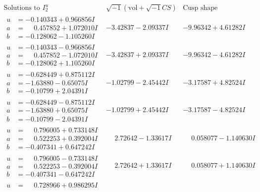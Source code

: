 \documentclass[1p]{elsarticle_modified}
\theoremstyle{definition}
\newcommand{\I}{\sqrt{-1}}
\begin{document}
$$\begin{array}{c|c|c}  
\text{Solutions to }I^u_{2}& \I (\text{vol} + \sqrt{-1}CS) & \text{Cusp shape}\\
 \hline 
\begin{aligned}
u &= -0.140343 + 0.966856 I \\
a &= \phantom{-}0.457852 + 1.072010 I \\
b &= -0.128062 - 1.105260 I\end{aligned}
 & -3.42837 - 2.09337 I & -9.96342 + 4.61282 I \\ \hline\begin{aligned}
u &= -0.140343 - 0.966856 I \\
a &= \phantom{-}0.457852 - 1.072010 I \\
b &= -0.128062 + 1.105260 I\end{aligned}
 & -3.42837 + 2.09337 I & -9.96342 - 4.61282 I \\ \hline\begin{aligned}
u &= -0.628449 + 0.875112 I \\
a &= -1.63880 - 0.65075 I \\
b &= -0.10799 + 2.04391 I\end{aligned}
 & -1.02799 - 2.45442 I & -3.17587 + 4.82524 I \\ \hline\begin{aligned}
u &= -0.628449 - 0.875112 I \\
a &= -1.63880 + 0.65075 I \\
b &= -0.10799 - 2.04391 I\end{aligned}
 & -1.02799 + 2.45442 I & -3.17587 - 4.82524 I \\ \hline\begin{aligned}
u &= \phantom{-}0.796005 + 0.733148 I \\
a &= \phantom{-}0.522253 + 0.392004 I \\
b &= -0.407341 + 0.647242 I\end{aligned}
 & \phantom{-}2.72642 - 1.33617 I & \phantom{-}0.058077 - 1.140630 I \\ \hline\begin{aligned}
u &= \phantom{-}0.796005 - 0.733148 I \\
a &= \phantom{-}0.522253 - 0.392004 I \\
b &= -0.407341 - 0.647242 I\end{aligned}
 & \phantom{-}2.72642 + 1.33617 I & \phantom{-}0.058077 + 1.140630 I \\ \hline\begin{aligned}
u &= \phantom{-}0.728966 + 0.986295 I \\

\end{aligned}
\end{array}$$
\end{document}
